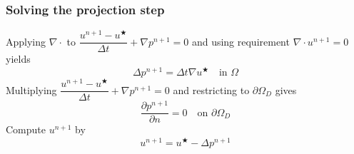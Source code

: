 \begin{frame}
  \frametitle{Solving the projection step}
  Applying $\nabla \cdot$ to 
  $
    \dfrac{u^{n+1} - u^{\bigstar}}{\Delta t} + \nabla p^{n+1} = 0
  $
  and using requirement $\nabla \cdot u^{n+1} = 0$ yields
  \begin{equation*}
    \Delta p^{n+1} = \Delta t \nabla u^{\bigstar} \quad \text{in }
    \Omega
  \end{equation*}
  Multiplying 
  $
    \dfrac{u^{n+1} - u^{\bigstar}}{\Delta t} + \nabla p^{n+1} = 0
  $
  and restricting to $\partial \Omega_D$ gives
  \begin{equation*}
    \dfrac{\partial p^{n+1}}{\partial n} = 0 \quad \text{on }
    \partial \Omega_D
  \end{equation*}
  Compute $u^{n+1}$ by
  \begin{equation*}
    u^{n+1} = u^{\bigstar} - \Delta p^{n+1}
  \end{equation*}
\end{frame}

